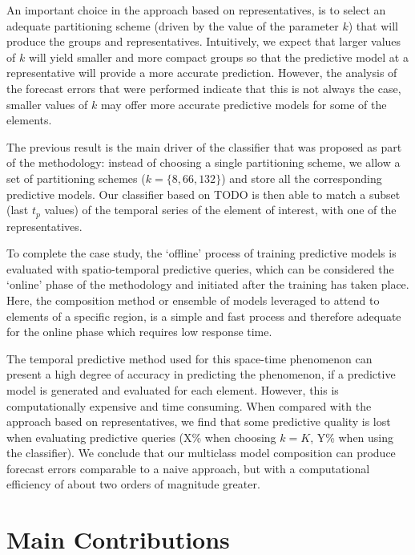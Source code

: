 An important choice in the approach based on representatives, is to select an adequate partitioning scheme (driven by the value of the parameter $k$) that will produce the groups and representatives. Intuitively, we expect that larger values of $k$ will yield smaller and more compact groups so that the predictive model at a representative will provide a more accurate prediction. However, the analysis of the forecast errors that were performed indicate that this is not always the case, smaller values of $k$ may offer more accurate predictive models for some of the elements.

The previous result is the main driver of the classifier that was proposed as part of the methodology: instead of choosing a single partitioning scheme, we allow a set of partitioning schemes ($k = \lbrace 8, 66, 132 \rbrace$) and store all the corresponding predictive models. Our classifier based on TODO is then able to match a subset (last $t_p$ values) of the temporal series of the element of interest, with one of the representatives. %

To complete the case study, the `offline' process of training predictive models is evaluated with spatio-temporal predictive queries, which can be considered the `online' phase of the methodology and initiated after the training has taken place. Here, the composition method or ensemble of models leveraged to attend to elements of a specific region, is a simple and fast process and therefore adequate for the online phase which requires low response time.

The temporal predictive method used for this space-time phenomenon can present a high degree of accuracy in predicting the phenomenon, if a predictive model is generated and evaluated for each element. However, this is computationally expensive and time consuming. When compared with the approach based on representatives, we find that some predictive quality is lost when evaluating predictive queries (X\% when choosing $k=K$, Y\% when using the classifier). We conclude that our multiclass model composition can produce forecast errors comparable to a naive approach, but with a computational efficiency of about two orders of magnitude greater.

\section{Main Contributions}
\label{Sec:MainContributions}

